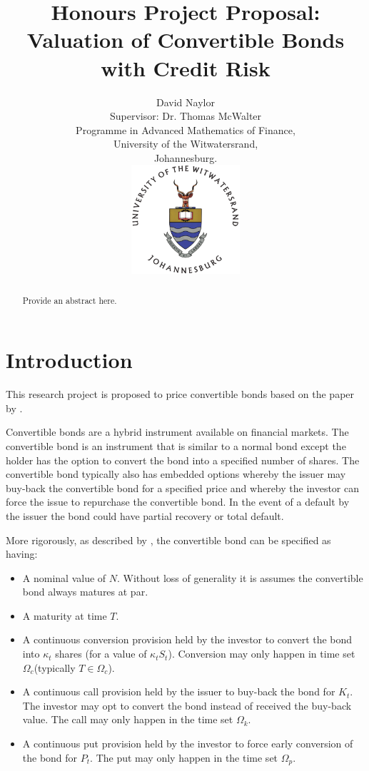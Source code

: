 \documentclass[a4paper,11pt,oneside]{article}
\title{Honours Project Proposal:\\
Valuation of Convertible Bonds with Credit Risk}
\author{David Naylor\\[1cm]
Supervisor: Dr. Thomas McWalter\\[3cm]
Programme in Advanced Mathematics of Finance,\\
University of the Witwatersrand,\\
Johannesburg.\\[2cm]
\includegraphics[width=4cm]{../common/WitsColourLogo}\\[2cm]
}
\newcommand{\setlinespacing}[1]
           {\renewcommand{\baselinestretch}{#1}\small\normalsize}
\def\convK{\ensuremath{\kappa_t}\xspace}
\def\convKS{\ensuremath{\convK S_t}\xspace}
\def\convT{\ensuremath{\Omega_c}\xspace}
\def\putK{\ensuremath{P_t}\xspace}
\def\putT{\ensuremath{\Omega_p}\xspace}
\def\callK{\ensuremath{K_t}\xspace}
\def\callT{\ensuremath{\Omega_k}\xspace}
\begin{document}
\maketitle
\thispagestyle{empty}

\setlinespacing{1.20}
\newpage

\setcounter{page}{1}


\def\abstractname{\Large Abstract}
\begin{abstract}
Provide an abstract here.
\end{abstract}



\section{Introduction}
This research project is proposed to price convertible bonds based on the paper by \citet{AFV03}.

Convertible bonds are a hybrid instrument available on financial markets.  The convertible bond is an instrument that is similar to a normal bond except the holder has the option to convert the bond into a specified number of shares.  The convertible bond typically also has embedded options whereby the issuer may buy-back the convertible bond for a specified price and whereby the investor can force the issue to repurchase the convertible bond.  In the event of a default by the issuer the bond could have partial recovery or total default.

More rigorously, as described by \cite{AKW08}, the convertible bond can be specified as having:
\begin{itemize}
 \item A nominal value of $N$.  Without loss of generality it is assumes the convertible bond always matures at par.
 \item A maturity at time $T$.
 \item A continuous conversion provision held by the investor to convert the bond into \convK shares (for a value of \convKS).  Conversion may only happen in time set \convT (typically $T \in \convT$).
 \item A continuous call provision held by the issuer to buy-back the bond for \callK.  The investor may opt to convert the bond instead of received the buy-back value.  The call may only happen in the time set \callT.
 \item A continuous put provision held by the investor to force early conversion of the bond for \putK.  The put may only happen in the time set \putT.
\end{itemize}
\end{document}

